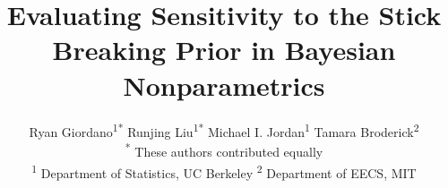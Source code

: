 \documentclass[a0,plainsections,30pt]{sciposter}\usepackage[]{graphicx}\usepackage[]{color}
\title{\textcolor{mydarkblue}{Evaluating Sensitivity to the Stick Breaking Prior in Bayesian Nonparametrics
}}
\author{Ryan Giordano\textsuperscript{1*} \quad 
Runjing Liu\textsuperscript{1*} \quad 
Michael I. Jordan\textsuperscript{1} \quad 
Tamara Broderick\textsuperscript{2} \\
{\large\normalfont\textsuperscript{*} These authors contributed equally}\\
 {\large\normalfont\textsuperscript{1} Department of Statistics, UC Berkeley \quad \textsuperscript{2} Department of EECS, MIT}
 }
\begin{document}


\setlength{\parskip}{0.25em}

\maketitle

\vspace{-1in}


\newcommand{\bnpalpha}{2}
\newcommand{\betamean}{0.38}
\newcommand{\betainfo}{0.10}
\newcommand{\gammascale}{0.10}
\newcommand{\gammashape}{10.00}
\newcommand{\bmean}{0}
\newcommand{\binfo}{0.10}
\newcommand{\nboot}{200}
\newcommand{\kapprox}{30}
\newcommand{\nobs}{1000}
\newcommand{\betadim}{7}
\newcommand{\ntime}{14}
\newcommand{\splinedegree}{3}





\end{document}
